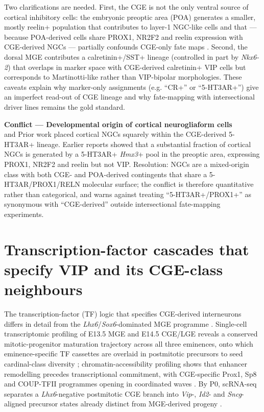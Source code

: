 \documentclass[11pt]{article}
\begin{document}
Two clarifications are needed. First, the CGE is not the only ventral source of cortical inhibitory cells: the embryonic preoptic area (POA) generates a smaller, mostly reelin+ population that contributes to layer-1 NGC-like cells and that --- because POA-derived cells share PROX1, NR2F2 and reelin expression with CGE-derived NGCs --- partially confounds CGE-only fate maps \citep{Gelman2009, Niquille2018}. Second, the dorsal MGE contributes a calretinin+/SST+ lineage (controlled in part by \textit{Nkx6-2}) that overlaps in marker space with CGE-derived calretinin+ VIP cells but corresponds to Martinotti-like rather than VIP-bipolar morphologies. These caveats explain why marker-only assignments (e.g. ``CR+'' or ``5-HT3AR+'') give an imperfect read-out of CGE lineage and why fate-mapping with intersectional driver lines remains the gold standard.

\begin{framed}
\textbf{Conflict --- Developmental origin of cortical neurogliaform cells}\\
\citet{Miyoshi2010} and Prior work \citep{Lee2010} placed cortical NGCs squarely within the CGE-derived 5-HT3AR+ lineage. Earlier reports \citep{Niquille2018} showed that a substantial fraction of cortical NGCs is generated by a 5-HT3AR+ \textit{Hmx3}+ pool in the preoptic area, expressing PROX1, NR2F2 and reelin but not VIP. Resolution: NGCs are a mixed-origin class with both CGE- and POA-derived contingents that share a 5-HT3AR/PROX1/RELN molecular surface; the conflict is therefore quantitative rather than categorical, and warns against treating ``5-HT3AR+/PROX1+'' as synonymous with ``CGE-derived'' outside intersectional fate-mapping experiments.
\end{framed}

\section{Transcription-factor cascades that specify VIP and its CGE-class neighbours}

The transcription-factor (TF) logic that specifies CGE-derived interneurons differs in detail from the \textit{Lhx6}/\textit{Sox6}-dominated MGE programme \citep{Liodis2007}. Single-cell transcriptomic profiling of E13.5 MGE and E14.5 CGE/LGE reveals a conserved mitotic-progenitor maturation trajectory across all three eminences, onto which eminence-specific TF cassettes are overlaid in postmitotic precursors to seed cardinal-class diversity \citep{Mayer2018}; chromatin-accessibility profiling shows that enhancer remodelling precedes transcriptional commitment, with CGE-specific Prox1, Sp8 and COUP-TFII programmes opening in coordinated waves \citep{Allaway2021}. By P0, scRNA-seq separates a \textit{Lhx6}-negative postmitotic CGE branch into \textit{Vip}-, \textit{Id2}- and \textit{Sncg}-aligned precursor states already distinct from MGE-derived progeny \citep{Mayer2018}.
\end{document}
